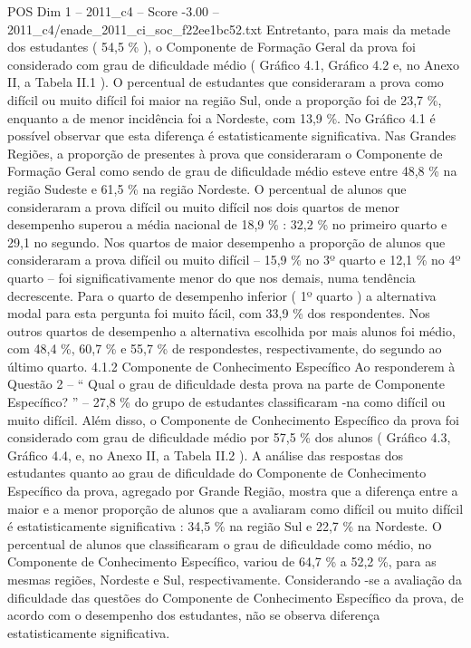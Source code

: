 \begin{textsample}{POS Dim 1 – 2011\_c4 – Score -3.00 – 2011\_c4/enade\_2011\_ci\_soc\_f22ee1bc52.txt}
Entretanto, para mais da metade dos estudantes ( 54,5 \% ), o Componente de Formação Geral da prova foi considerado com grau de dificuldade médio ( Gráfico 4.1, Gráfico 4.2 e, no Anexo II, a Tabela II.1 ).
O percentual de estudantes que consideraram a prova como difícil ou muito difícil foi maior na região Sul, onde a proporção foi de 23,7 \%, enquanto a de menor incidência foi a Nordeste, com 13,9 \%.
No Gráfico 4.1 é possível observar que esta diferença é estatisticamente significativa.
Nas Grandes Regiões, a proporção de presentes à prova que consideraram o Componente de Formação Geral como sendo de grau de dificuldade médio esteve entre 48,8 \% na região Sudeste e 61,5 \% na região Nordeste.
O percentual de alunos que consideraram a prova difícil ou muito difícil nos dois quartos de menor desempenho superou a média nacional de 18,9 \% : 32,2 \% no primeiro quarto e 29,1 no segundo.
Nos quartos de maior desempenho a proporção de alunos que consideraram a prova difícil ou muito difícil – 15,9 \% no 3º quarto e 12,1 \% no 4º quarto – foi significativamente menor do que nos demais, numa tendência decrescente.
Para o quarto de desempenho inferior ( 1º quarto ) a alternativa modal para esta pergunta foi muito fácil, com 33,9 \% dos respondentes.
Nos outros quartos de desempenho a alternativa escolhida por mais alunos foi médio, com 48,4 \%, 60,7 \% e 55,7 \% de respondestes, respectivamente, do segundo ao último quarto. 4.1.2 Componente de Conhecimento Específico Ao responderem à Questão 2 – “ Qual o grau de dificuldade desta prova na parte de Componente Específico? ” – 27,8 \% do grupo de estudantes classificaram -na como difícil ou muito difícil.
Além disso, o Componente de Conhecimento Específico da prova foi considerado com grau de dificuldade médio por 57,5 \% dos alunos ( Gráfico 4.3, Gráfico 4.4, e, no Anexo II, a Tabela II.2 ).
A análise das respostas dos estudantes quanto ao grau de dificuldade do Componente de Conhecimento Específico da prova, agregado por Grande Região, mostra que a diferença entre a maior e a menor proporção de alunos que a avaliaram como difícil ou muito difícil é estatisticamente significativa : 34,5 \% na região Sul e 22,7 \% na Nordeste.
O percentual de alunos que classificaram o grau de dificuldade como médio, no Componente de Conhecimento Específico, variou de 64,7 \% a 52,2 \%, para as mesmas regiões, Nordeste e Sul, respectivamente.
Considerando -se a avaliação da dificuldade das questões do Componente de Conhecimento Específico da prova, de acordo com o desempenho dos estudantes, não se observa diferença estatisticamente significativa.

\end{textsample}
